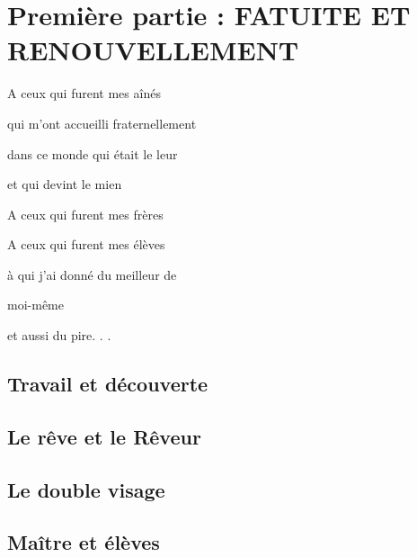 \part{Première partie : FATUITE ET RENOUVELLEMENT}

\newpage

\begin{center}
    A ceux qui furent mes aînés
    
    qui m’ont accueilli fraternellement  
    
    dans ce monde qui était le leur  
    
    et qui devint le mien

    \vspace{1cm}

    A ceux qui furent mes frères
    
    A ceux qui furent mes élèves  
    
    à qui j’ai donné du meilleur de  
    
    moi-même  
    
    et aussi du pire. . .
\end{center}

\newpage

\chapter{Travail et découverte}




\chapter{Le rêve et le Rêveur}











\chapter{Le double visage}









\chapter{Maître et élèves}










